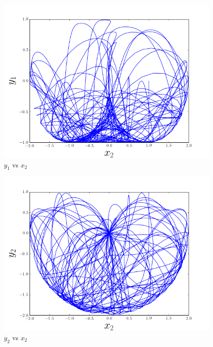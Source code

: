 \documentclass[a4paper,10pt]{article}
\numberwithin{equation}{section}
\begin{document}
\begin{figure}[H]
\center
\includegraphics[scale=0.5]{problema2fig4}
\caption{$y_1$ vs $x_2$}
\label{fig:problema2fig4}
\end{figure}

\begin{figure}[H]
\center
\includegraphics[scale=0.5]{problema2fig5}
\caption{$y_2$ vs $x_2$}
\label{fig:problema2fig5}
\end{figure}
\end{document}
